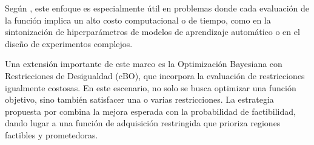 Según \citeauthor{gardner2014bayesian} \citeyear{gardner2014bayesian}, este enfoque es especialmente útil en problemas donde cada evaluación de la función implica un alto costo computacional o de tiempo, como en la sintonización de hiperparámetros de modelos de aprendizaje automático o en el diseño de experimentos complejos.

Una extensión importante de este marco es la Optimización Bayesiana con Restricciones de Desigualdad (cBO), que incorpora la evaluación de restricciones igualmente costosas. En este escenario, no solo se busca optimizar una función objetivo, sino también satisfacer una o varias restricciones. La estrategia propuesta por \citeauthor{gardner2014bayesian} combina la mejora esperada con la probabilidad de factibilidad, dando lugar a una función de adquisición restringida que prioriza regiones factibles y prometedoras.
